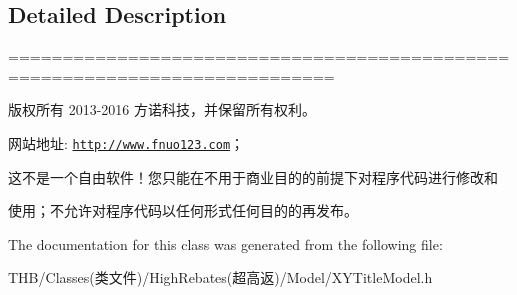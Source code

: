 \subsection{Detailed Description}
============================================================================

版权所有 2013-\/2016 方诺科技，并保留所有权利。

网站地址\+: \href{http://www.fnuo123.com}{\tt http\+://www.\+fnuo123.\+com}； 



这不是一个自由软件！您只能在不用于商业目的的前提下对程序代码进行修改和

使用；不允许对程序代码以任何形式任何目的的再发布。 

 

The documentation for this class was generated from the following file\+:\begin{DoxyCompactItemize}
\item 
T\+H\+B/\+Classes(类文件)/\+High\+Rebates(超高返)/\+Model/X\+Y\+Title\+Model.\+h\end{DoxyCompactItemize}
